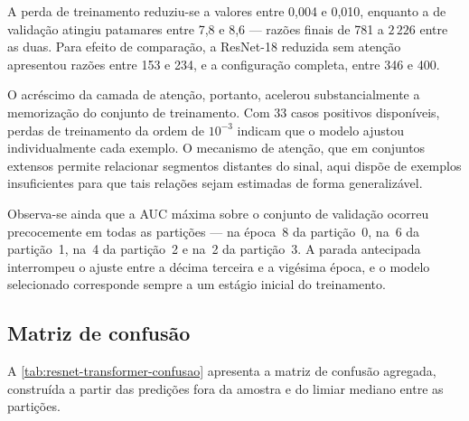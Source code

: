 A perda de treinamento reduziu-se a valores entre 0,004 e 0,010, enquanto a
de validação atingiu patamares entre 7,8 e 8,6 --- razões finais de 781 a
$2\,226$ entre as duas. Para efeito de comparação, a ResNet-18 reduzida sem
atenção apresentou razões entre 153 e 234, e a configuração completa, entre
346 e 400.

O acréscimo da camada de atenção, portanto, acelerou substancialmente a
memorização do conjunto de treinamento. Com 33 casos positivos disponíveis,
perdas de treinamento da ordem de $10^{-3}$ indicam que o modelo ajustou
individualmente cada exemplo. O mecanismo de atenção, que em conjuntos
extensos permite relacionar segmentos distantes do sinal, aqui dispõe de
exemplos insuficientes para que tais relações sejam estimadas de forma
generalizável.

Observa-se ainda que a \gls{AUC} máxima sobre o conjunto de validação ocorreu
precocemente em todas as partições --- na época~8 da partição~0, na~6 da
partição~1, na~4 da partição~2 e na~2 da partição~3. A parada antecipada
interrompeu o ajuste entre a décima terceira e a vigésima época, e o modelo
selecionado corresponde sempre a um estágio inicial do treinamento.

\subsection{Matriz de confusão}
\label{subsec:confusao-resnet18-transformer}

A \autoref{tab:resnet-transformer-confusao} apresenta a matriz de confusão
agregada, construída a partir das predições fora da amostra e do limiar
mediano entre as partições.

\begin{table}[h!]
	\captionsetup{width=11cm}
\end{table}

